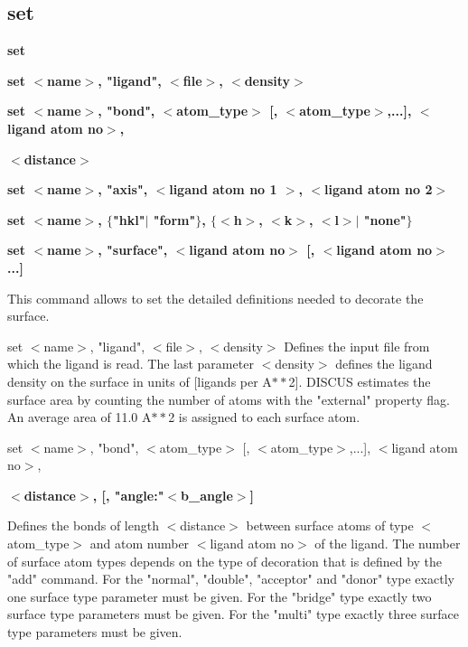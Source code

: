 \subsection*{set}
{\bf set \par }
{\bf set $ <$name$> $, "ligand", $ <$file$> $, $ <$density$> $ \par }
{\bf set $ <$name$> $, "bond", $ <$atom\_type$> $ [, $ <$atom\_type$> $,...], $ <$ligand atom no$> $, \par }
{\bf                                                      $ <$distance$> $ \par }
{\bf set $ <$name$> $, "axis", $ <$ligand atom no 1 $> $, $ <$ligand atom no 2$> $ \par }
{\bf set $ <$name$> $, $ \{$"hkl"$| $ "form"$\} $, $ \{$$ <$h$> $, $ <$k$> $, $ <$l$> $$| $ "none"$\} $ \par }
{\bf set $ <$name$> $, "surface", $ <$ligand atom no$> $ [, $ <$ligand atom no$> $...] \par }
\par
\vspace{3pt}
This command allows to set the detailed definitions needed to decorate the 
surface. 
\par
set $ <$name$> $, "ligand", $ <$file$> $, $ <$density$> $ 
    Defines the input file from which the ligand is read. 
    The last parameter $ <$density$> $ defines the ligand density on the surface in 
    units of [ligands per A$**$2]. DISCUS estimates the surface area by counting 
    the number of atoms with the "external" property flag. An average area of 
    11.0 A$**$2 is assigned to each surface atom. 
\par
set $ <$name$> $, "bond", $ <$atom\_type$> $ [, $ <$atom\_type$> $,...], $ <$ligand atom no$> $, 
{\bf                     $ <$distance$> $, [, "angle:"$ <$b\_angle$> $] \par }
\vspace{3pt}
    Defines the bonds of length $ <$distance$> $ between surface atoms of type 
    $ <$atom\_type$> $ and atom number $ <$ligand atom no$> $ of the ligand. 
    The number of surface atom types depends on the type of decoration that 
    is defined by the "add" command. 
    For the "normal", "double", "acceptor" and "donor" type exactly 
        one surface type parameter must be given. 
    For the "bridge" type exactly two surface type 
        parameters must be given. 
    For the "multi" type exactly three surface type 
        parameters must be given. 
\par
